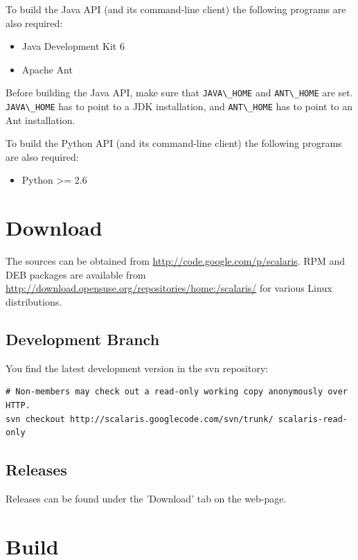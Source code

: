 \documentclass[a4paper]{scrreprt}
\newcommand{\code}[1]{\lstinline[basicstyle=\ttfamily]!#1!}
\begin{document}
To build the Java API (and its command-line client) the following
programs are also required:

\begin{itemize}
\setlength{\itemsep}{0pt}
\setlength{\parskip}{0pt}
\item Java Development Kit 6
\item Apache Ant
\end{itemize}

Before building the Java API, make sure that \code{JAVA\_HOME} and
\code{ANT\_HOME} are set. \code{JAVA\_HOME} has to point to a JDK
installation, and \code{ANT\_HOME} has to point to an Ant installation.

To build the Python API (and its command-line client) the following
programs are also required:

\begin{itemize}
\setlength{\itemsep}{0pt}
\setlength{\parskip}{0pt}
\item Python >= 2.6
\end{itemize}

\section{Download}

The sources can be obtained from
\url{http://code.google.com/p/scalaris}. RPM and DEB packages are available
from \url{http://download.opensuse.org/repositories/home:/scalaris/} for
various Linux distributions.

\subsection{Development Branch}

You find the latest development version in the svn repository:
\begin{lstlisting}[language={}]
# Non-members may check out a read-only working copy anonymously over HTTP.
svn checkout http://scalaris.googlecode.com/svn/trunk/ scalaris-read-only
\end{lstlisting}

\subsection{Releases}

Releases can be found under the 'Download' tab on the web-page.


\section{Build}
\end{document}
